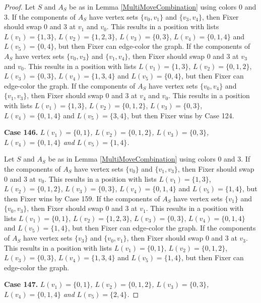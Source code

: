 \documentclass[12pt]{amsart}
\theoremstyle{plain}
\theoremstyle{definition}
\theoremstyle{remark}
\begin{document}
\begin{proof}
Let $S$ and $A_S$ be as in Lemma \ref{MultiMoveCombination} using colors $0$ and $3$. If the components of $A_S$ have vertex sets $\{v_0, v_1\}$ and $\{v_3, v_4\}$, then Fixer should swap 0 and 3 at $v_1$ and $v_0$. This results in a position with lists $L(v_1) = \{1, 3\}$, $L(v_2) = \{1, 2, 3\}$, $L(v_3) = \{0, 3\}$, $L(v_4) = \{0, 1, 4\}$ and $L(v_5) = \{0, 4\}$, but then Fixer can edge-color the graph.
If the components of $A_S$ have vertex sets $\{v_0, v_3\}$ and $\{v_1, v_4\}$, then Fixer should swap 0 and 3 at $v_3$ and $v_0$. This results in a position with lists $L(v_1) = \{1, 3\}$, $L(v_2) = \{0, 1, 2\}$, $L(v_3) = \{0, 3\}$, $L(v_4) = \{1, 3, 4\}$ and $L(v_5) = \{0, 4\}$, but then Fixer can edge-color the graph.
If the components of $A_S$ have vertex sets $\{v_0, v_4\}$ and $\{v_1, v_3\}$, then Fixer should swap 0 and 3 at $v_4$ and $v_0$. This results in a position with lists $L(v_1) = \{1, 3\}$, $L(v_2) = \{0, 1, 2\}$, $L(v_3) = \{0, 3\}$, $L(v_4) = \{0, 1, 4\}$ and $L(v_5) = \{3, 4\}$, but then Fixer wins by Case 124.

\noindent\textbf{Case 146.  }\textit{$L(v_1) = \{0, 1\}$, $L(v_2) = \{0, 1, 2\}$, $L(v_3) = \{0, 3\}$, $L(v_4) = \{0, 1, 4\}$ and $L(v_5) = \{1, 4\}$.}

Let $S$ and $A_S$ be as in Lemma \ref{MultiMoveCombination} using colors $0$ and $3$. If the components of $A_S$ have vertex sets $\{v_0\}$ and $\{v_1, v_3\}$, then Fixer should swap 0 and 3 at $v_0$. This results in a position with lists $L(v_1) = \{1, 3\}$, $L(v_2) = \{0, 1, 2\}$, $L(v_3) = \{0, 3\}$, $L(v_4) = \{0, 1, 4\}$ and $L(v_5) = \{1, 4\}$, but then Fixer wins by Case 159.
If the components of $A_S$ have vertex sets $\{v_1\}$ and $\{v_0, v_3\}$, then Fixer should swap 0 and 3 at $v_1$. This results in a position with lists $L(v_1) = \{0, 1\}$, $L(v_2) = \{1, 2, 3\}$, $L(v_3) = \{0, 3\}$, $L(v_4) = \{0, 1, 4\}$ and $L(v_5) = \{1, 4\}$, but then Fixer can edge-color the graph.
If the components of $A_S$ have vertex sets $\{v_3\}$ and $\{v_0, v_1\}$, then Fixer should swap 0 and 3 at $v_3$. This results in a position with lists $L(v_1) = \{0, 1\}$, $L(v_2) = \{0, 1, 2\}$, $L(v_3) = \{0, 3\}$, $L(v_4) = \{1, 3, 4\}$ and $L(v_5) = \{1, 4\}$, but then Fixer can edge-color the graph.

\noindent\textbf{Case 147.  }\textit{$L(v_1) = \{0, 1\}$, $L(v_2) = \{0, 1, 2\}$, $L(v_3) = \{0, 3\}$, $L(v_4) = \{0, 1, 4\}$ and $L(v_5) = \{2, 4\}$.}


\end{proof}
\end{document}
